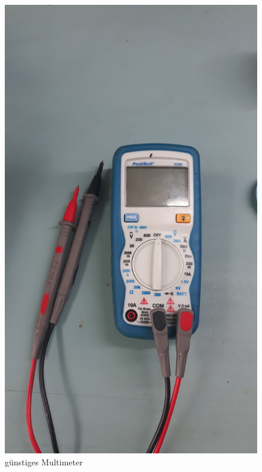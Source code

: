 \documentclass[12pt, a4paper]{article}		%
\begin{document}
\begin{figure}[H]
	\centering
		\includegraphics[width=0.99\textwidth]{Grafiken/20200726_121402.jpg}
	\caption{günstiges Multimeter}
	\label{fig:20200726_121402}
\end{figure}
\end{document}

